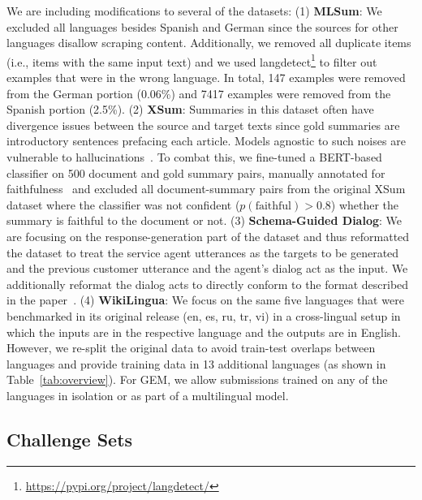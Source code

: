 \documentclass[11pt,a4paper]{article}
\newcommand{\GEM}{\textsc{GEM}}
\begin{document}
We are including modifications to several of the datasets: (1) \textbf{MLSum}: We excluded all languages besides Spanish and German since the sources for other languages disallow scraping content. Additionally, we removed all duplicate items (i.e., items with the same input text) and we used langdetect\footnote{\url{https://pypi.org/project/langdetect/}} to filter out examples that were in the wrong language. In total, 147 examples were removed from the German portion (0.06\%) and 7417 examples were removed from the Spanish portion (2.5\%).
(2) \textbf{XSum}: Summaries in this dataset often have divergence issues between the source and target texts since gold summaries are introductory sentences prefacing each article. Models agnostic to such noises are vulnerable to hallucinations~\citep{wiseman-etal-2017-challenges,dhingra2019handling}. To combat this, we fine-tuned a BERT-based~\citep{devlin-2019-bert} classifier on 500 document and gold summary pairs, manually annotated for faithfulness~\citep{maynez2020faithfulness} and excluded all document-summary pairs from the original XSum dataset where the classifier was not confident ($p(\textrm{faithful}) > 0.8$) whether the summary is faithful to the document or not.
(3) \textbf{Schema-Guided Dialog}: We are focusing on the response-generation part of the dataset and thus reformatted the dataset to treat the service agent utterances as the targets to be generated and the previous customer utterance and the agent's dialog act as the input. We additionally reformat the dialog acts to directly conform to the format described in the paper~\citep{kale2020few}. 
(4) \textbf{WikiLingua}: We focus on the same five languages that were benchmarked in its original release (en, es, ru, tr, vi) in a cross-lingual setup in which the inputs are in the respective language and the outputs are in English. However, we re-split the original data to avoid train-test overlaps between languages and provide training data in 13 additional languages (as shown in Table~\ref{tab:overview}). For \GEM, we allow submissions trained on any of the languages in isolation or as part of a multilingual model. 


\subsection{Challenge Sets} 
\end{document}
